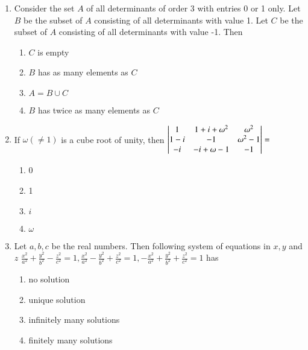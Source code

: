 \documentclass[journal,12pt,twocolumn]{IEEEtran}
\theoremstyle{remark}
\begin{document}
\begin{enumerate}[label=\arabic*.]
	\item Consider the set $A$ of all determinants of order 3 with entries
		0 or 1 only. Let $B$ be the subset of $A$ consisting of all
		determinants with value 1. Let $C$ be the subset of $A$ consisting
		of all determinants with value -1. Then
		\hfill {}
		\begin{enumerate}[label=(\alph*)]
			\item $C$ is empty
			\item $B$ has as many elements as $C$
			\item $A = B \cup C$
			\item $B$ has twice as many elements as $C$
		\end{enumerate}

	\item If $\omega (\ne 1)$ is a cube root of unity, then
		$\begin{vmatrix}
			1 & 1 + i + \omega^2 & \omega^2 \\
			1 - i & -1 & \omega^2 - 1 \\
			-i & -i + \omega - 1 & -1
		\end{vmatrix} = $
		\hfill {}
	
		\begin{multicols}{4}
			\begin{enumerate}[label=(\alph*)]
				\item 0
				\item 1
				\item $i$
				\item $\omega$
			\end{enumerate}
		\end{multicols}

	\item Let $a, b, c$ be the real numbers. Then following system of
		equations in $x, y$ and $z$ 
		\hfill \brak{1995S}
		$
		\frac{x^2}{a^2} + \frac{y^2}{b^2} - \frac{z^2}{c^2} = 1	,
		\frac{x^2}{a^2} - \frac{y^2}{b^2} + \frac{z^2}{c^2} = 1	,
		-\frac{x^2}{a^2} + \frac{y^2}{b^2} + \frac{z^2}{c^2} = 1
		$ has

		\begin{multicols}{2}
			\begin{enumerate}[label=(\alph*)]
				\item no solution
				\item unique solution
				\columnbreak
				\item infinitely many solutions
				\item finitely many solutions
			\end{enumerate}
		\end{multicols}


\end{enumerate}
\end{document}
